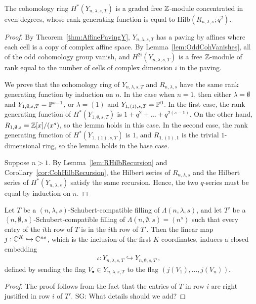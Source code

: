 \documentclass[12pt]{amsart}
\newcommand{\Hilb}{\mathrm{Hilb}}
\newcommand{\la}{\lambda}
\newcommand{\SG}[1]{{\color{red} SG: #1}}
\begin{document}
\begin{corollary}\label{cor:RankGenNLaS}
The cohomology ring $H^*(Y_{n,\la,s,T})$ is a graded free $\mathbb{Z}$-module concentrated in even degrees, whose rank generating function is equal to $\Hilb(R_{n,\la,s};q^2)$.
\end{corollary}
\begin{proof}
By Theorem~\ref{thm:AffinePavingY}, $Y_{n,\la,s,T}$ has a paving by affines where each cell is a copy of complex affine space. By Lemma~\ref{lem:OddCohVanishes}, all of the odd cohomology group vanish, and $H^{2i}(Y_{n,\la,s,T})$ is a free $\mathbb{Z}$-module of rank equal to the number of cells of complex dimension $i$ in the paving.

We prove that the cohomology ring of $Y_{n,\la,s,T}$ and $R_{n,\la,s}$ have the same rank generating function by induction on $n$. In the case when $n=1$, then either $\la = \emptyset$ and $Y_{1,\emptyset,s,T} = \mathbb{P}^{s-1}$, or $\la = (1)$ and $Y_{1,(1),s,T} = \mathbb{P}^0$. In the first case, the rank generating function of $H^*(Y_{1,\emptyset,s,T})$ is $1 + q^2 +\dots + q^{2(s-1)}$. On the other hand, $R_{1,\emptyset,s} = \mathbb{Z}[x]/(x^s)$, so the lemma holds in this case. In the second case, the rank generating function of $H^*(Y_{1,(1),s,T})$ is $1$, and $R_{1,(1),1}$ is the trivial $1$-dimensional ring, so the lemma holds in the base case.

Suppose $n>1$. By Lemma~\ref{lem:RHilbRecursion} and Corollary~\ref{cor:CohHilbRecursion}, the Hilbert series of $R_{n,\la,s}$ and the Hilbert series of $H^*(Y_{n,\lambda,s})$ satisfy the same recursion. Hence, the two $q$-series must be equal by induction on $n$. 
\end{proof}

\begin{lemma}\label{lem:Embedding}
Let $T$ be a $(n,\la,s)$-Schubert-compatible filling of $\Lambda(n,\la,s)$, and let $T'$ be a $(n,\emptyset,s)$-Schubert-compatible filling of $\Lambda(n,\emptyset,s) = (n^s)$ such that every entry of the $i$th row of $T$ is in the $i$th row of $T'$. Then the linear map $j : \mathbb{C}^K \hookrightarrow \mathbb{C}^{ns}$, which is the inclusion of the first $K$ coordinates, induces a closed embedding 
\begin{align}
\iota : Y_{n,\la,s,T}\hookrightarrow Y_{n,\emptyset,s,T'},
\end{align}
defined by sending the flag $V_\bullet\in Y_{n,\la,s,T}$ to the flag $(j(V_1),\dots, j(V_n))$.
\end{lemma}

\begin{proof}
The proof follows from the fact that the entries of $T$ in row $i$ are right justified in row $i$ of $T'$. \SG{What details should we add?}
\end{proof}
\end{document}
